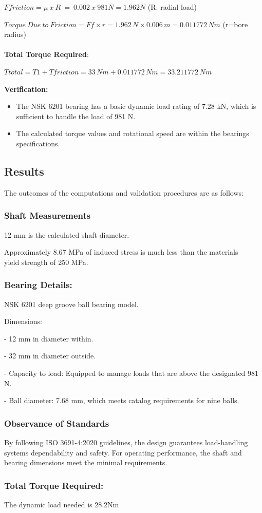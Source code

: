 \documentclass[../../main]{subfiles}
\begin{document}
\(Ffriction = \mu\ x\ R\  = \ 0.002\ x\ 981N = 1.962N\) (R: radial load)

\(Torque\ Due\ to\ Friction = Ff \times r = 1.962\, N \times 0.006\, m = 0.011772\, Nm\)
(r=bore radius)
\\ \\
\textbf{Total Torque Required}:

\(Ttotal = T1 + Tfriction = 33\, Nm + 0.011772\, Nm = 33.211772\, Nm\)

\textbf{Verification:}

\begin{itemize}
\item
  The NSK 6201 bearing has a basic dynamic load rating of 7.28 kN, which
  is sufficient to handle the load of 981 N.
\item
  The calculated torque values and rotational speed are within the
  bearing\textquotesingle s specifications.
\end{itemize}

\subsection{Results}

The outcomes of the computations and validation procedures are as
follows:

\subsubsection{Shaft Measurements}

12 mm is the calculated shaft diameter.

Approximately 8.67 MPa of induced stress is much less than the
material\textquotesingle s \\ yield strength of 250 MPa.

\subsubsection{Bearing Details:}
NSK 6201 deep groove ball bearing model.

Dimensions:

- 12 mm in diameter within.

- 32 mm in diameter outside.

- Capacity to load: Equipped to manage loads that are above the
designated 981 N.

- Ball diameter: 7.68 mm, which meets catalog requirements for nine
balls.

\subsubsection{Observance of Standards}
By following ISO 3691-4:2020 guidelines, the design guarantees
load-handling systems\textquotesingle{} dependability and safety. For
operating performance, the shaft and bearing dimensions meet the minimal
requirements.

\subsubsection{Total Torque Required:}

The dynamic load needed is 28.2Nm
\end{document}
